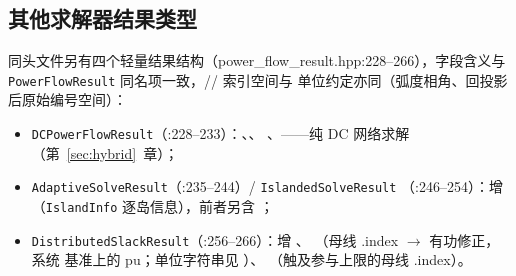 \subsection{其他求解器结果类型}
同头文件另有四个轻量结果结构（power\_flow\_result.hpp:228--266），字段含义与
\texttt{PowerFlowResult} 同名项一致，// 索引空间与
单位约定亦同（弧度相角、回投影后原始编号空间）：
\begin{itemize}
  \item \texttt{DCPowerFlowResult}（:228--233）：、、
        、——纯 DC 网络求解（第~\ref{sec:hybrid}~章）；
  \item \texttt{AdaptiveSolveResult}（:235--244）/ \texttt{IslandedSolveResult}
        （:246--254）：增 （\texttt{IslandInfo} 逐岛信息），前者另含 ；
  \item \texttt{DistributedSlackResult}（:256--266）：增 、
        （母线 .index $\to$ 有功修正，系统
         基准上的 pu；单位字符串见
        ）、
        （触及参与上限的母线 .index）。
\end{itemize}
